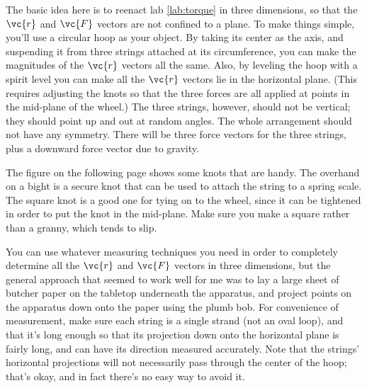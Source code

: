 \label{lab:torque-in-three-dimensions}

\apparatus
{}



\observations

The basic idea here is to reenact lab \ref{lab:torque} in three
dimensions, so that the $\vc{r}$ and $\vc{F}$ vectors are not confined
to a plane. To make things simple, you'll use a circular hoop as your
object. By taking its center as the axis, and suspending it from three
strings attached at its circumference, you can make the magnitudes of
the $\vc{r}$ vectors all the same. Also, by leveling the hoop with a
spirit level you can make all the $\vc{r}$ vectors lie in the
horizontal plane. (This requires adjusting the knots so that the three
forces are all applied at points in the mid-plane of the wheel.) The
three strings, however, should not be vertical; they should point up
and out at random angles. The whole arrangement should not have any
symmetry.  There will be three force vectors for the three strings,
plus a downward force vector due to gravity. 

The figure on the following page shows some knots that are handy. The overhand on a bight is a secure
knot that can be used to attach the string to a spring scale. The square knot
is a good one for tying on to the wheel, since it can be tightened in order
to put the knot in the mid-plane. Make sure you make a square rather than a granny,
which tends to slip.


You can use whatever measuring techniques you need in order to completely determine all the $\vc{r}$ and $\vc{F}$ vectors in three
dimensions, but the general approach that seemed to work well for me was to lay a large sheet of butcher paper on the tabletop underneath
the apparatus, and project points on the apparatus down onto the paper using the plumb bob.
For convenience of measurement, make sure each string is a single strand (not an oval loop), and that
it's long enough so that its projection down onto the horizontal plane is fairly long, and can have its direction measured accurately.
Note that the strings' horizontal projections will not necessarily pass through the center of the hoop; that's okay, and in fact
there's no easy way to avoid it.


